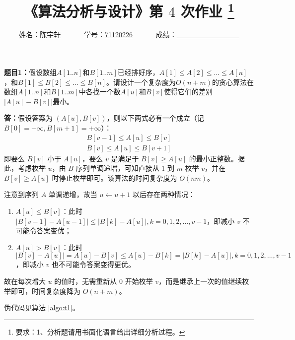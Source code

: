 \documentclass[12pt,a4paper]{ctexart}
\begin{document}

\title{
  {\heiti《算法分析与设计》第 $4$ 次作业
    \footnote{要求：1、分析题请用书面化语言给出详细分析过程。}
    }
}
\date{}

\author{
姓名：\underline{陈宇轩}~~~~~~
学号：\underline{71120226}~~~~~~
成绩：\underline{~~~~~~~~~~~~~~~~~~}
}

\maketitle

\noindent
\section*{\bf \color{red}{算法分析题}}

\noindent
{\bf 题目1：}假设数组$A[1..n]$和$B[1..m]$已经排好序，$A[1] \leq A[2] \leq ... \leq A[n]$，和$B[1] \leq B[2] \leq ... \leq B[n]$。请设计一个复杂度为$O(n+m)$的贪心算法在数组$A[1..n]$和$B[1..m]$中各找一个数$A[u]$和$B[v]$使得它们的差别$|A[u]-B[v]|$最小。

\vspace{5pt}
\noindent
{\bf 答：}假设答案为 $(A[u], B[v])$，则以下两式必有一个成立（记 $B[0] = -\infty, B[m+1] = +\infty$）：
\begin{gather}
  B[v-1] \leq A[u] \leq B[v] \\
  B[v] \leq A[u] \leq B[v+1]
\end{gather}
即要么 $B[v]$ 小于 $A[u]$，要么 $v$ 是满足于 $B[v] \geq A[u]$ 的最小正整数。据此，考虑枚举 $u$，由 $B$ 序列单调递增，可知直接从 $1$ 到 $m$ 枚举 $v$，并在 $B[v] \geq A[u]$ 时停止枚举即可。该算法的时间复杂度为 $O(nm)$。

注意到序列 $A$ 单调递增，故当 $u \gets u+1$ 以后存在两种情况：
\begin{enumerate}
  \item $A[u] \leq B[v]$：此时 $|B[v-1] - A[u-1]| \leq |B[k] - A[u]|, k = 0,1,2,\ldots,v-1$，即减小 $v$ 不可能令答案变优；
  \item $A[u] > B[v]$：此时 $|B[v] - A[u]| = A[u] - B[v] \leq A[u] - B[k] = |B[k] - A[u]|, k=0,1,2,\ldots,v-1$，即减小 $v$ 也不可能令答案变得更优。
\end{enumerate}
故在每次增大 $u$ 的值时，无需重新从 $0$ 开始枚举 $v$，而是继承上一次的值继续枚举即可，时间复杂度降为 $O(n+m)$。

伪代码见算法 \ref{algo:t1}。
\end{document}
